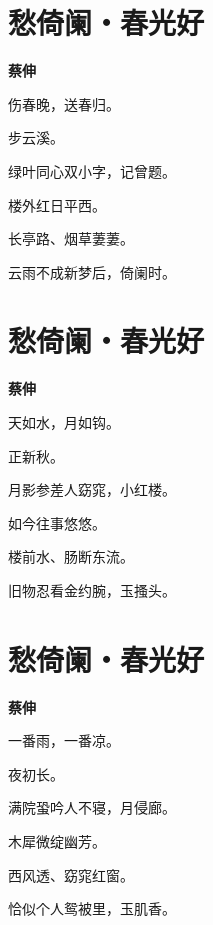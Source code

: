 \documentclass[12pt,a4paper]{ctexbook}
\begin{document}
\section{愁倚阑・春光好}
\textbf{蔡伸}\par\vspace{0.5em}
伤春晚，送春归。\par
步云溪。\par
绿叶同心双小字，记曾题。\par
楼外红日平西。\par
长亭路、烟草萋萋。\par
云雨不成新梦后，倚阑时。\par

\section{愁倚阑・春光好}
\textbf{蔡伸}\par\vspace{0.5em}
天如水，月如钩。\par
正新秋。\par
月影参差人窈窕，小红楼。\par
如今往事悠悠。\par
楼前水、肠断东流。\par
旧物忍看金约腕，玉搔头。\par

\section{愁倚阑・春光好}
\textbf{蔡伸}\par\vspace{0.5em}
一番雨，一番凉。\par
夜初长。\par
满院蛩吟人不寝，月侵廊。\par
木犀微绽幽芳。\par
西风透、窈窕红窗。\par
恰似个人鸳被里，玉肌香。\par
\end{document}
